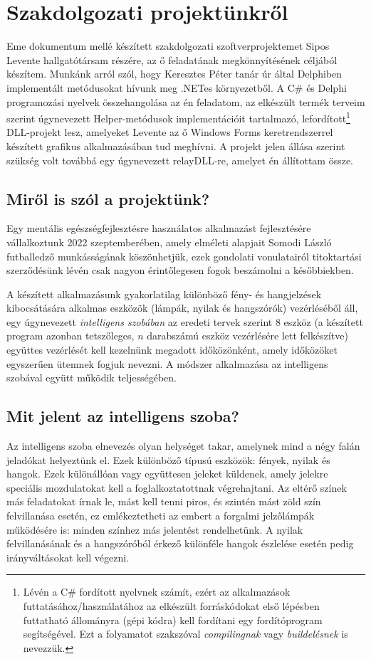 \documentclass[tocnopagenum]{thesis-ekf}
\theoremstyle{definition}
\theoremstyle{remark}
\begin{document}
	\chapter{Szakdolgozati projektünkről}
	Eme dokumentum mellé készített szakdolgozati szoftverprojektemet Sipos Levente hallgatótársam részére, az ő feladatának megkönnyítésének céljából készítem. 
	Munkánk arról szól, hogy Keresztes Péter tanár úr által Delphiben implementált metódusokat hívunk meg .NETes környezetből. A C\# és Delphi programozási nyelvek összehangolása az én feladatom, az elkészült termék terveim szerint úgynevezett Helper-metódusok implementációit tartalmazó, lefordított\footnote{Lévén a C\# fordított nyelvnek számít, ezért az alkalmazások futtatásához/használatához az elkészült forráskódokat első lépésben futtatható állományra (gépi kódra) kell fordítani egy fordítóprogram segítségével. Ezt a folyamatot szakszóval \textit{compilingnak} vagy \textit{buildelésnek} is nevezzük.} DLL-projekt lesz, amelyeket Levente az ő Windows Forms keretrendszerrel készített grafikus alkalmazásában tud meghívni. A projekt jelen állása szerint szükség volt továbbá egy úgynevezett relayDLL-re, amelyet én állítottam össze.
	
	\section{Miről is szól a projektünk?}
	Egy mentális egészségfejlesztésre használatos alkalmazást fejlesztésére vállalkoztunk 2022 szeptemberében, amely elméleti alapjait Somodi László futballedző munkásságának köszönhetjük, ezek gondolati vonulatairól titoktartási szerződésünk lévén csak nagyon érintőlegesen fogok beszámolni a későbbiekben. 
	
	A készített alkalmazásunk gyakorlatilag különböző fény- és hangjelzések kibocsátására alkalmas eszközök (lámpák, nyilak és hangszórók) vezérléséből áll, egy úgynevezett \emph{intelligens szobában} az eredeti tervek szerint 8 eszköz (a készített program azonban tetszőleges, $n$ darabszámú eszköz vezérlésére lett felkészítve) együttes vezérlését kell kezelnünk megadott időközönként, amely időközöket egyszerűen ütemnek fogjuk nevezni.
	A módszer alkalmazása az intelligens szobával együtt működik teljességében.
	
	\section{Mit jelent az intelligens szoba?}
	Az intelligens szoba elnevezés olyan helységet takar, amelynek mind a négy falán jeladókat helyeztünk el.
	Ezek különböző típusú eszközök: fények, nyilak és hangok. 
	Ezek különállóan vagy együttesen jeleket küldenek, amely jelekre speciális mozdulatokat kell a foglalkoztatottnak végrehajtani.
	Az eltérő színek más feladatokat írnak le, mást kell tenni piros, és szintén mást zöld szín felvillanása esetén, ez emlékeztetheti az embert a forgalmi jelzőlámpák működésére is: minden színhez más jelentést rendelhetünk. A nyilak felvillanásának és a hangszóróból érkező különféle hangok észlelése esetén pedig irányváltásokat kell végezni.
	
\end{document}
